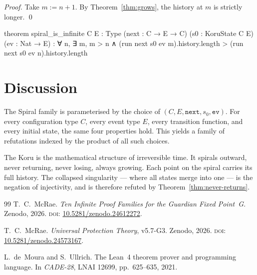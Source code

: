\begin{proof}
Take $m := n + 1$. By Theorem~\ref{thm:grows}, the history at $m$ is strictly longer. \qed
\end{proof}

\begin{leancode}
theorem spiral_is_infinite {C E : Type} (next : C → E → C)
    (s0 : KoruState C E) (ev : Nat → E) :
    ∀ n, ∃ m, m > n ∧
        (run next s0 ev m).history.length >
        (run next s0 ev n).history.length
\end{leancode}

\section{Discussion}

The Spiral family is parameterised by the choice of $(C, E, \texttt{next}, s_0, \texttt{ev})$. For every configuration type $C$, every event type $E$, every transition function, and every initial state, the same four properties hold. This yields a family of refutations indexed by the product of all such choices.

The Koru is the mathematical structure of irreversible time. It spirals outward, never returning, never losing, always growing. Each point on the spiral carries its full history. The collapsed singularity --- where all states merge into one --- is the negation of injectivity, and is therefore refuted by Theorem~\ref{thm:never-returns}.

\bigskip

\begin{thebibliography}{99}
T.~C.~McRae.
\emph{Ten Infinite Proof Families for the Guardian Fixed Point~G}.
Zenodo, 2026.
\textsc{doi:} \href{https://doi.org/10.5281/zenodo.24612272}{10.5281/zenodo.24612272}.

T.~C.~McRae.
\emph{Universal Protection Theory}, v5.7-G3.
Zenodo, 2026.
\textsc{doi:} \href{https://doi.org/10.5281/zenodo.24573167}{10.5281/zenodo.24573167}.

L.~de~Moura and S.~Ullrich.
The Lean~4 theorem prover and programming language.
In \emph{CADE-28}, LNAI 12699, pp.~625--635, 2021.
\end{thebibliography}


